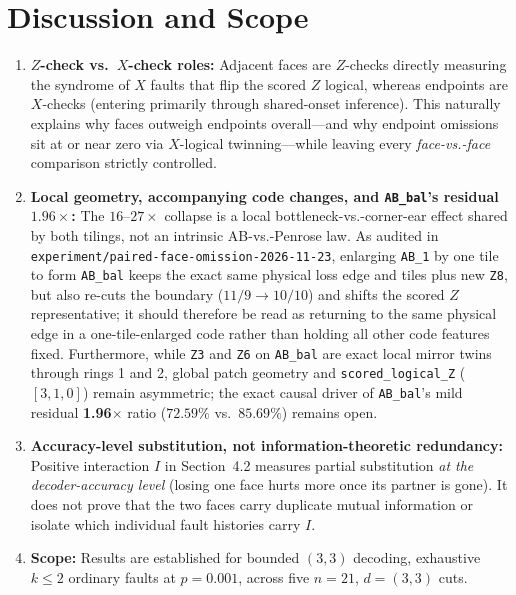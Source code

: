\documentclass[11pt,a4paper]{article}
\begin{document}
\section{Discussion and Scope}
\begin{enumerate}
    \item \textbf{$Z$-check vs.\ $X$-check roles:} Adjacent faces are $Z$-checks directly measuring the syndrome of $X$ faults that flip the scored $Z$ logical, whereas endpoints are $X$-checks (entering primarily through shared-onset inference). This naturally explains why faces outweigh endpoints overall---and why endpoint omissions sit at or near zero via $X$-logical twinning---while leaving every \emph{face-vs.-face} comparison strictly controlled.
    \item \textbf{Local geometry, accompanying code changes, and \texttt{AB\_bal}'s residual $1.96\times$:} The $16$--$27\times$ collapse is a local bottleneck-vs.-corner-ear effect shared by both tilings, not an intrinsic AB-vs.-Penrose law. As audited in \texttt{experiment/paired-face-omission-2026-11-23}, enlarging \texttt{AB\_1} by one tile to form \texttt{AB\_bal} keeps the exact same physical loss edge and tiles plus new \texttt{Z8}, but also re-cuts the boundary ($11/9 \to 10/10$) and shifts the scored $Z$ representative; it should therefore be read as returning to the same physical edge in a one-tile-enlarged code rather than holding all other code features fixed. Furthermore, while \texttt{Z3} and \texttt{Z6} on \texttt{AB\_bal} are exact local mirror twins through rings 1 and 2, global patch geometry and \texttt{scored\_logical\_Z} ($[3,1,0]$) remain asymmetric; the exact causal driver of \texttt{AB\_bal}'s mild residual \textbf{1.96$\times$} ratio ($72.59\%$ vs.\ $85.69\%$) remains open.
    \item \textbf{Accuracy-level substitution, not information-theoretic redundancy:} Positive interaction $I$ in Section~4.2 measures partial substitution \emph{at the decoder-accuracy level} (losing one face hurts more once its partner is gone). It does not prove that the two faces carry duplicate mutual information or isolate which individual fault histories carry $I$.
    \item \textbf{Scope:} Results are established for bounded $(3,3)$ decoding, exhaustive $k \le 2$ ordinary faults at $p = 0.001$, across five $n=21$, $d=(3,3)$ cuts.
\end{enumerate}
\end{document}
